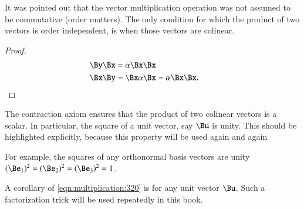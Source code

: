 %
%
It was pointed out that the vector multiplication operation was not assumed to be commutative (order matters).
The only condition for which the product of two vectors is order independent, is when those vectors are colinear.


\begin{proof}
\begin{align*}
\By \Bx &= \alpha \Bx \Bx \\
\Bx \By &= \Bx \alpha \Bx = \alpha \Bx \Bx.
&& \qedhere
\end{align*}
\end{proof}

The contraction axiom ensures that the product of two colinear vectors is a scalar.
In particular, the square of a unit vector, say \( \Bu \) is unity.
This should be highlighted explicitly, because this property will be used again and again

For example, the squares of any orthonormal basis vectors are unity \( (\Be_1)^2 = (\Be_2)^2 = (\Be_3)^2 = 1 \).

A corollary of
\cref{eqn:multiplication:320} is
for any unit vector \( \Bu \).
Such a factorization trick will be used repeatedly in this book.
